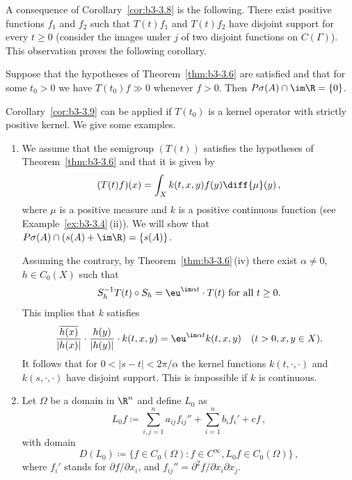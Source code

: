 A consequence of Corollary~\ref{cor:b3-3.8} is the following. 
There exist positive functions $f_{1}$ and $f_{2}$ such that $T(t)f_{1}$ and $T(t)f_{2}$ have disjoint support for every $t \geq 0$ (consider the images under $j$ of two disjoint functions on $C(\Gamma)$).
This observation proves the following corollary.
\begin{corollary}\label{cor:b3-3.9}

	Suppose that the hypotheses of Theorem~\ref{thm:b3-3.6} are satisfied and that for some $t_{0} > 0$ we have $T(t_{0})f \gg 0$ whenever $f > 0$.
	Then $P\sigma(A)\cap \im\R = \{0\}$.
\end{corollary}
Corollary~\ref{cor:b3-3.9} can be applied if\/ $T(t_{0})$ is a kernel operator%
with strictly positive kernel.
We give some examples.
\begin{examples}\label{ex:b3-3.10}
%
	
	\begin{enumerate}[\upshape (i), wide, labelindent=.25em] 
	\item 
	We assume that the semigroup $(T(t))$ satisfies the hypotheses of Theorem~\ref{thm:b3-3.6} and that it is given by
	\[
	(T(t)f)(x) = \int_{X} k(t,x,y)f(y) \diff{\mu}(y)\,,
	\]
	where $\mu$ is a positive measure and $k$ is a positive continuous function (see Example~\ref{ex:b3-3.4}\,(ii)).
	We will show that $P\sigma(A)\cap(s(A) + \im\R) = \{s(A)\}$.
	
	Assuming the contrary, by Theorem~\ref{thm:b3-3.6}\,(iv) there exist $\alpha \neq 0$, $h \in C_{0}(X)$ such that
	\begin{equation}\label{eq:b3-3.10}
	S_{h}^{-1}T(t)\circ S_{h} = \eu^{\im\alpha t}\cdot T(t) \text{ for all } t \geq 0.
	\end{equation}
	This implies that $k$ satisfies
	\begin{equation}\label{eq:b3-3.11}
	\frac{\overline{h(x)}}{|h(x)|}\cdot\frac{h(y)}{|h(y)|}\cdot k(t,x,y) = \eu^{\im\alpha t}k(t,x,y) \quad (t > 0, x,y \in X).
	\end{equation}
	It follows that for $0 < |s-t| < 2\pi/\alpha$ the kernel functions  $k(t,\cdot,\cdot)$ and $k(s,\cdot,\cdot)$ have disjoint support.
	This is impossible if\/ $k$ is continuous.
	
	\item 
	Let $\Omega$ be a domain in $\R^{n}$ and define $L_{0}$ as
	\[
	L_{0}f \coloneq \sum_{i,j=1}^{n} a_{ij}f_{ij}'' + \sum_{i=1}^{n}b_{i}f_{i}' + cf\,,
	\]
	with domain 
    \[
    D(L_{0}) \coloneq \{f \in C_{0}(\Omega) \colon f \in  C^{\infty}, L_{0}f \in C_{0}(\Omega)\}\,,
    \]
	where $f_{i}'$ stands for $\partial f/\partial x_{i}$, and $f_{ij}'' = \partial^{2}f/\partial x_{i}\partial x_{j}$.
	

\end{enumerate}
\end{examples}
